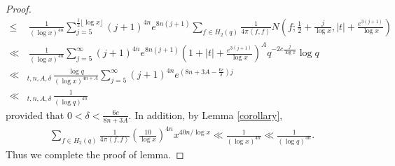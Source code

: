 \documentclass[11pt,reqno]{amsart}
\numberwithin{equation}{section}
\theoremstyle{plain}
\theoremstyle{definition}
\begin{document}
\begin{proof}
\begin{equation*}
\begin{split}
\leq&\,\frac{1}{(\log x)^{4n}}\sum_{j=5}^{\frac{1}{2}\lfloor\log x\rfloor}\left(j+1\right)^{4n}
e^{8n(j+1)}\sum_{f\in H_2(q)}\frac{1}{4\pi \left<f,f\right>}
N\left(f;\frac{1}{2}+\frac{j}{\log x}, |t|+\frac{e^{3(j+1)}}{\log x}\right)\\
\ll&\,\frac{1}{(\log x)^{4n}}\sum_{j=5}^{\infty}\left(j+1\right)^{4n}
e^{8n(j+1)}\left(1+|t|+\frac{e^{3(j+1)}}{\log x}\right)^A q^{-2c\frac{j}{\log x}}\log q\\
\ll&_{t,n,A,\delta}\,\frac{\log q}{(\log x)^{4n+A}}\sum_{j=5}^{\infty}\left(j+1\right)^{4n}
e^{(8n+3A-\frac{6c}{\delta})j}\\
\ll&_{t,n,A,\delta}\,\frac{1}{(\log q)^{4n}}
\end{split}
\end{equation*}
provided that $0<\delta<\frac{6c}{8n+3A}$. 
In addition, by Lemma \ref{corollary},
\begin{equation*}
\begin{split}
\sum_{f\in H_2(q)}\frac{1}{4\pi \left<f,f\right>}
\left(\frac{10}{\log x}\right)^{4n}x^{40n/\log x}
\ll\frac{1}{(\log x)^{4n}}\ll\frac{1}{(\log q)^{4n}}.
\end{split}
\end{equation*}
Thus we complete the proof of lemma.
\end{proof}
\end{document}
